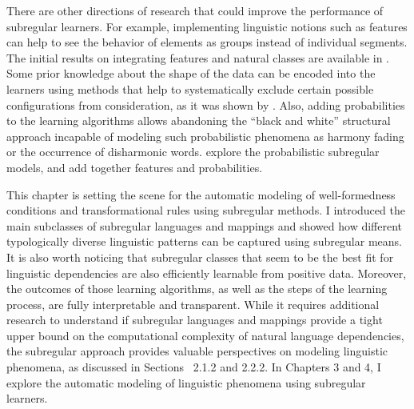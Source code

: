 There are other directions of research that could improve the performance of subregular learners.
For example, implementing linguistic notions such as features can help to see the behavior of elements as groups instead of individual segments.
The initial results on integrating features and natural classes are available in \citep{Strother-Garcia-HeinzEtAl-2016-UMTGICSP,chandlee-etal-2019-learning}.
Some prior knowledge about the shape of the data can be encoded into the learners using methods that help to systematically exclude certain possible configurations from consideration, as it was shown by \cite{WellmanHenrion1993}.
Also, adding probabilities to the learning algorithms allows abandoning the ``black and white'' structural approach incapable of modeling such probabilistic phenomena as harmony fading or the occurrence of disharmonic words.
\cite{HeinzRogers2010SPdist,Shibata-Heinz-2019-MLEFRDSL} explore the probabilistic subregular models, and \cite{Heinz-Koirala-2010-MLEFD,VuZehfrooshEtal2018-SRLUSM} add together features and probabilities.

\bigskip\bigskip

This chapter is setting the scene for the automatic modeling of well-formedness conditions and transformational rules using subregular methods.
I introduced the main subclasses of subregular languages and mappings and showed how different typologically diverse linguistic patterns can be captured using subregular means.
It is also worth noticing that subregular classes that seem to be the best fit for linguistic dependencies are also efficiently learnable from positive data.
Moreover, the outcomes of those learning algorithms, as well as the steps of the learning process, are fully interpretable and transparent.
While it requires additional research to understand if subregular languages and mappings provide a tight upper bound on the computational complexity of natural language dependencies, the subregular approach provides valuable perspectives on modeling linguistic phenomena, as discussed in Sections~ 2.1.2 and 2.2.2.
In Chapters 3 and 4, I explore the automatic modeling of linguistic phenomena using subregular learners.